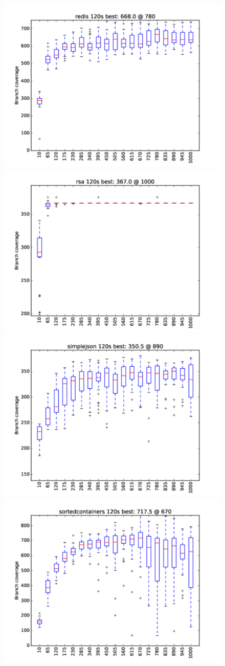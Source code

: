 \documentclass[sigplan,screen]{acmart}
\begin{document}
\begin{figure}
\includegraphics[width=0.8\columnwidth]{graphs/redisrand120}
\includegraphics[width=0.8\columnwidth]{graphs/rsarand120}
\includegraphics[width=0.8\columnwidth]{graphs/simplejsonrand120}
\includegraphics[width=0.8\columnwidth]{graphs/sortedcontainersrand120}

\end{figure}
\end{document}
